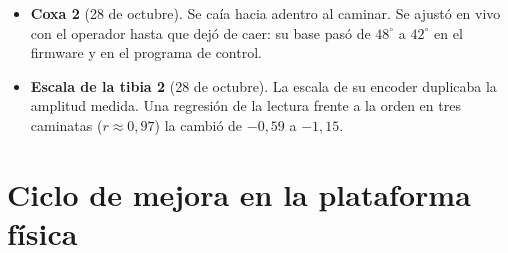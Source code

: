 \begin{itemize}
    nueva, con otras posiciones de apoyo y el movimiento de las tibias 2 y 4 invertido
    (sección de marchas nominales). Las comparaciones anteriores se repitieron por
    ello (sección~\ref{sec:postura27}). Ese día se detectó también que las políticas
    de gateo v14 y trote v15 se habían ejecutado sin la apertura de los fémures, porque
    un programa de selección dañó sus metadatos; se corrigió y se repararon los archivos.
    \item \textbf{Coxa 2} (28 de octubre). Se caía hacia adentro al caminar. Se ajustó
    en vivo con el operador hasta que dejó de caer: su base pasó de $48^\circ$ a
    $42^\circ$ en el firmware y en el programa de control.
    \item \textbf{Escala de la tibia 2} (28 de octubre). La escala de su encoder
    duplicaba la amplitud medida. Una regresión de la lectura frente a la orden en tres
    caminatas ($r\approx0{,}97$) la cambió de $-0{,}59$ a $-1{,}15$.
\end{itemize}

\section{Ciclo de mejora en la plataforma física}

